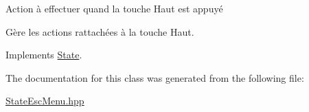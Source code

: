 Action à effectuer quand la touche Haut est appuyé 

Gère les actions rattachées à la touche Haut. 

Implements \hyperlink{class_state_ab3837b57093899dbdb323540c75a79e8}{State}.



The documentation for this class was generated from the following file\+:\begin{DoxyCompactItemize}
\item 
\hyperlink{_state_esc_menu_8hpp}{State\+Esc\+Menu.\+hpp}\end{DoxyCompactItemize}

